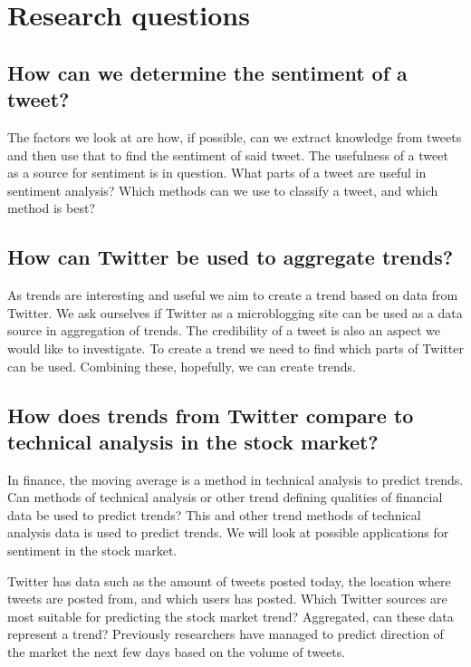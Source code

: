 \section{Research questions}\label{introduction:research_questions}
\subsection{How can we determine the sentiment of a
tweet?}\label{introduction:rq1}

The factors we look at are how, if possible, can we extract knowledge from
tweets and then use that to find the sentiment of said tweet. The usefulness of
a tweet as a source for sentiment is in question. What parts of a tweet are
useful in sentiment analysis? Which methods can we use to classify a tweet, and
which method is best?

\subsection{How can Twitter be used to aggregate trends?}\label{introduction:rq2}
As trends are interesting and useful we aim to create a trend based on data
from Twitter. We ask ourselves if Twitter as a microblogging site can be used as a
data source in aggregation of trends. The credibility of a tweet is also an
aspect we would like to investigate. To create a trend we need to find which
parts of Twitter can be used. Combining these, hopefully, we can create trends. 

\subsection{How does trends from Twitter compare to technical analysis in the
stock market?}\label{introduction:rq3}
In finance, the moving average is a method in technical analysis to predict
trends. Can methods of technical analysis or other trend defining qualities of
financial data be used to predict trends? This and other trend methods of
technical analysis data is used to predict trends.  We will look at possible
applications for sentiment in the stock market.

Twitter has data such as the amount of tweets posted today, the location where
tweets are posted from, and which users has posted. Which Twitter sources are
most suitable for predicting the stock market trend? Aggregated, can these data
represent a trend? Previously researchers have managed to predict
direction of the market the next few days based on the volume of
tweets\cite[]{doukas10:sentiment_and_momentum}.  

